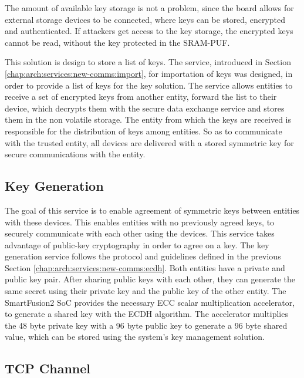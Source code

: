 The amount of available key storage is not a problem, since the board allows for external storage devices to be connected, where keys can be stored, encrypted and authenticated. If attackers get access to the key storage, the encrypted keys cannot be read, without the key protected in the SRAM-PUF.

This solution is design to store a list of keys. The service, introduced in Section \ref{chap:arch:services:new-comms:import}, for importation of keys was designed, in order to provide a list of keys for the key solution.
The service allows entities to receive a set of encrypted keys from another entity, forward the list to their device, which decrypts them with the secure data exchange service and stores them in the non volatile storage.
The entity from which the keys are received is responsible for the distribution of keys among entities. So as to communicate with the trusted entity, all devices are delivered with a stored symmetric key for secure communications with the entity.

\subsection{Key Generation}\label{chap:implementation:services:key-generation}

The goal of this service is to enable agreement of symmetric keys between entities with these devices. This enables entities with no previously agreed keys, to securely communicate with each other using the devices.
This service takes advantage of public-key cryptography in order to agree on a key.
The key generation service follows the protocol and guidelines defined in the previous Section \ref{chap:arch:services:new-comms:ecdh}.
Both entities have a private and public key pair. After sharing public keys with each other, they can generate the same secret using their private key and the public key of the other entity.
The SmartFusion2 SoC provides the necessary ECC scalar multiplication accelerator, to generate a shared key with the ECDH algorithm. The accelerator multiplies the 48 byte private key with a 96 byte public key to generate a 96 byte shared value, which can be stored using the system's key management solution.

\subsection{TCP Channel}\label{chap:implementation:services:secure:tcp}

